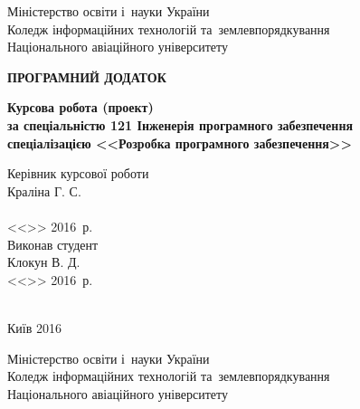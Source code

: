 \documentclass[a4paper,oneside,titlepage,14pt]{extarticle}
\newcommand{\blank}[1]{\underline{\hspace{#1}}}
\begin{document}
	\leading{21pt}
	


	\begin{titlepage}
		\begin{center}
			Міністерство освіти і~науки України \\
			Коледж інформаційних технологій та~землевпорядкування\\
			Національного авіаційного університету\par
			
			\vspace*{\fill}
			
			{\textbf{ПРОГРАМНИЙ ДОДАТОК}\par}\vspace{\baselineskip}
			\textbf{Курсова робота (проект)\\
			за спеціальністю 121 Інженерія програмного забезпечення\\
			спеціалізацією <<Розробка програмного забезпечення>>}\par \vspace{\baselineskip}
			\hspace*{\fill}
			\begin{minipage}{5.75cm}
				\begin{flushleft}
					Керівник курсової роботи \\
					Краліна Г. С.\\
					\blank{5.75cm}\\
					<<\blank{1cm}>> \blank{2.567cm} 2016~р.\\
					Виконав студент\\
					Клокун В. Д.\\
					<<\blank{1cm}>> \blank{2.567cm} 2016~р.\\
				\end{flushleft}
			\end{minipage}\\[\baselineskip]
			\vspace*{\fill}
			Київ 2016
		\end{center}
	\end{titlepage}
	
	\newpage
	
	{
	\centering
	Міністерство освіти і~науки України \\
	Коледж інформаційних технологій та~землевпорядкування\\
	Національного авіаційного університету\par
	}\vspace*{\baselineskip}
	
\end{document}
